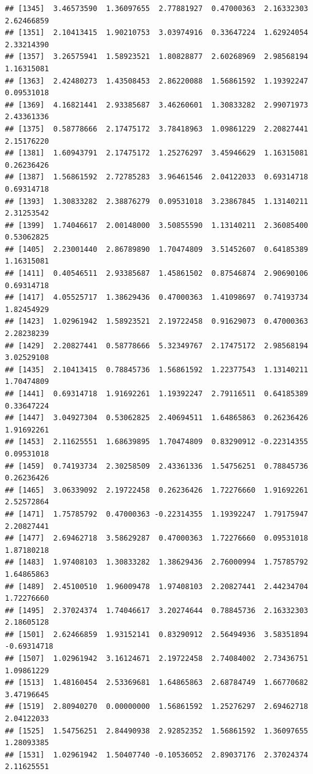 \documentclass[
]{article}
\begin{document}
\begin{verbatim}
## [1345]  3.46573590  1.36097655  2.77881927  0.47000363  2.16332303  2.62466859
## [1351]  2.10413415  1.90210753  3.03974916  0.33647224  1.62924054  2.33214390
## [1357]  3.26575941  1.58923521  1.80828877  2.60268969  2.98568194  1.16315081
## [1363]  2.42480273  1.43508453  2.86220088  1.56861592  1.19392247  0.09531018
## [1369]  4.16821441  2.93385687  3.46260601  1.30833282  2.99071973  2.43361336
## [1375]  0.58778666  2.17475172  3.78418963  1.09861229  2.20827441  2.15176220
## [1381]  1.60943791  2.17475172  1.25276297  3.45946629  1.16315081  0.26236426
## [1387]  1.56861592  2.72785283  3.96461546  2.04122033  0.69314718  0.69314718
## [1393]  1.30833282  2.38876279  0.09531018  3.23867845  1.13140211  2.31253542
## [1399]  1.74046617  2.00148000  3.50855590  1.13140211  2.36085400  0.53062825
## [1405]  2.23001440  2.86789890  1.70474809  3.51452607  0.64185389  1.16315081
## [1411]  0.40546511  2.93385687  1.45861502  0.87546874  2.90690106  0.69314718
## [1417]  4.05525717  1.38629436  0.47000363  1.41098697  0.74193734  1.82454929
## [1423]  1.02961942  1.58923521  2.19722458  0.91629073  0.47000363  2.28238239
## [1429]  2.20827441  0.58778666  5.32349767  2.17475172  2.98568194  3.02529108
## [1435]  2.10413415  0.78845736  1.56861592  1.22377543  1.13140211  1.70474809
## [1441]  0.69314718  1.91692261  1.19392247  2.79116511  0.64185389  0.33647224
## [1447]  3.04927304  0.53062825  2.40694511  1.64865863  0.26236426  1.91692261
## [1453]  2.11625551  1.68639895  1.70474809  0.83290912 -0.22314355  0.09531018
## [1459]  0.74193734  2.30258509  2.43361336  1.54756251  0.78845736  0.26236426
## [1465]  3.06339092  2.19722458  0.26236426  1.72276660  1.91692261  2.52572864
## [1471]  1.75785792  0.47000363 -0.22314355  1.19392247  1.79175947  2.20827441
## [1477]  2.69462718  3.58629287  0.47000363  1.72276660  0.09531018  1.87180218
## [1483]  1.97408103  1.30833282  1.38629436  2.76000994  1.75785792  1.64865863
## [1489]  2.45100510  1.96009478  1.97408103  2.20827441  2.44234704  1.72276660
## [1495]  2.37024374  1.74046617  3.20274644  0.78845736  2.16332303  2.18605128
## [1501]  2.62466859  1.93152141  0.83290912  2.56494936  3.58351894 -0.69314718
## [1507]  1.02961942  3.16124671  2.19722458  2.74084002  2.73436751  1.09861229
## [1513]  1.48160454  2.53369681  1.64865863  2.68784749  1.66770682  3.47196645
## [1519]  2.80940270  0.00000000  1.56861592  1.25276297  2.69462718  2.04122033
## [1525]  1.54756251  2.84490938  2.92852352  1.56861592  1.36097655  1.28093385
## [1531]  1.02961942  1.50407740 -0.10536052  2.89037176  2.37024374  2.11625551

\end{verbatim}
\end{document}
